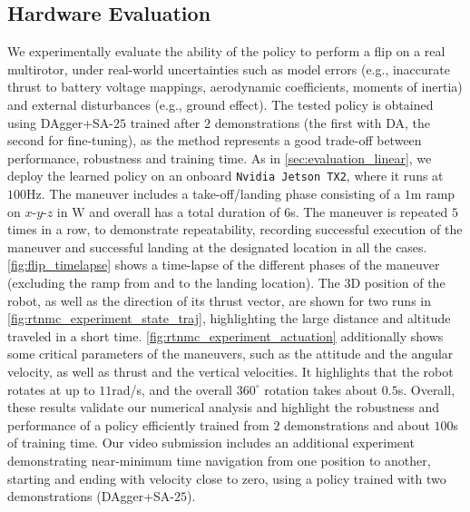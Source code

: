\subsection{Hardware Evaluation}
We experimentally evaluate the ability of the policy to perform a flip on a real multirotor, under real-world uncertainties such as model errors (e.g., inaccurate thrust to battery voltage mappings, aerodynamic coefficients, moments of inertia) and external disturbances (e.g., ground effect). The tested policy is obtained using DAgger+SA-$25$ trained after $2$ demonstrations (the first with \ac{DA}, the second for fine-tuning), as the method represents a good trade-off between performance, robustness and training time. As in \cref{sec:evaluation_linear}, we deploy the learned policy on an onboard \texttt{Nvidia Jetson TX2}, where it runs at $100$Hz. The maneuver includes a take-off/landing phase consisting of a $1$m ramp on $x$-$y$-$z$ in $\text{W}$ and overall has a total duration of $6$s. The maneuver is repeated $5$ times in a row, to demonstrate repeatability, recording successful execution of the maneuver and successful landing at the designated location in all the cases. \cref{fig:flip_timelapse} shows a time-lapse of the different phases of the maneuver (excluding the ramp from and to the landing location). The 3D position of the robot, as well as the direction of its thrust vector, are shown for two runs in \cref{fig:rtnmc_experiment_state_traj}, highlighting the large distance and altitude traveled in a short time. \cref{fig:rtnmc_experiment_actuation} additionally shows some critical parameters of the maneuvers, such as the attitude and the angular velocity, as well as thrust and the vertical velocities. It highlights that the robot rotates at up to $11$rad/s, and the overall $360^\circ$ rotation takes about $0.5$s. Overall, these results validate our numerical analysis and highlight the robustness and performance of a policy efficiently trained from $2$ demonstrations and about $100$s of training time. Our video submission \cite{video_submission} includes an additional experiment demonstrating near-minimum time navigation from one position to another, starting and ending with velocity close to zero, using a policy trained with two demonstrations (DAgger+SA-$25$).

